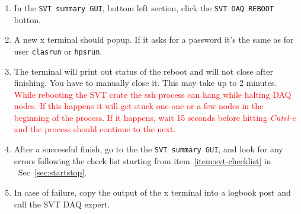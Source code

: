 \documentclass[12pt]{article}
\begin{document}
\begin{enumerate}

\item
In the \texttt{SVT summary GUI}, bottom left section, click the \texttt{SVT DAQ REBOOT} button.

\item
A new x terminal should popup. If it asks for a password it's the same as for user \texttt{clasrun} or \texttt{hpsrun}.

\item
The terminal will print out status of the reboot and will not close after finishing. You have to manually close it. \newline
This may take up to 2 minutes.\newline
\textcolor{red}{While rebooting the SVT crate the ssh process can hang while halting DAQ nodes. If this happens it will get stuck one one or a few nodes in the beginning of the process. If it happens, wait 15 seconds before hitting {\em Cntrl-c} and the process should continue to the next. }

\item 
After a successful finish, go to the the \texttt{SVT summary GUI}, and look for any errors following the check list starting from item~\ref{item:svt-checklist} in ~Sec~\ref{sec:startstop}.

\item
In case of failure, copy the output of the x terminal into a logbook post and call the SVT DAQ expert.



\end{enumerate}
\end{document}
